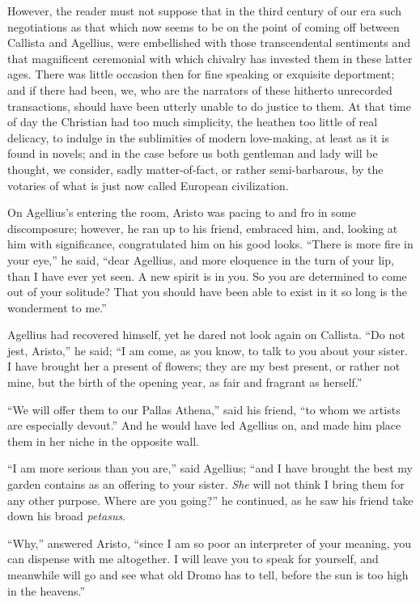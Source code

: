 However, the reader must not suppose that in the third century of
our era such negotiations as that which now seems to be on the point
of coming off between Callista and Agellius, were embellished with
those transcendental sentiments and that magnificent ceremonial with
which chivalry has invested them in these latter ages. There was
little occasion then for fine speaking or exquisite deportment; and if
there had been, we, who are the narrators of these hitherto unrecorded
transactions, should have been utterly unable to do justice to them.
At that time of day the Christian had too much simplicity, the heathen
too little of real delicacy, to indulge in the sublimities of modern
love-making, at least as it is found in novels; and in the case before
us both gentleman and lady will be thought, we consider, sadly
matter-of-fact, or rather semi-barbarous, by the votaries of what is
just now called European civilization.

On Agellius's entering the room, Aristo was pacing to and fro in
some discomposure; however, he ran up to his friend, embraced him,
and, looking at him with significance, congratulated him on his good
looks. ``There is more fire in your eye,'' he said, ``dear
Agellius, and more eloquence in the turn of your lip, than I have ever
yet seen. A new spirit is in you. So you are determined to come out of
your solitude? That you should have been able to exist in it so long
is the wonderment to me.''

Agellius had recovered himself, yet he dared not look again on
Callista. ``Do not jest, Aristo,'' he said; ``I am come,
as you know, to talk to you about your sister. I have brought her a
present of flowers; they are my best present, or rather not mine, but
the birth of the opening year, as fair and fragrant as herself.''

``We will offer them to our Pallas Athena,'' said his
friend, ``to whom we artists are especially devout.'' And he
would have led Agellius on, and made him place them in her niche in
the opposite wall.

``I am more serious than you are,'' said Agellius;
``and I have brought the best my garden contains as an offering to
your sister. \emph{She} will not think I bring them for any other
purpose. Where are you going?'' he continued, as he saw his friend
take down his broad \emph{petasus}.

``Why,'' answered Aristo, ``since I am so poor an
interpreter of your meaning, you can dispense with me altogether. I
will leave you to speak for yourself, and meanwhile will go and see
what old Dromo has to tell, before the sun is too high in the
heavens.''

